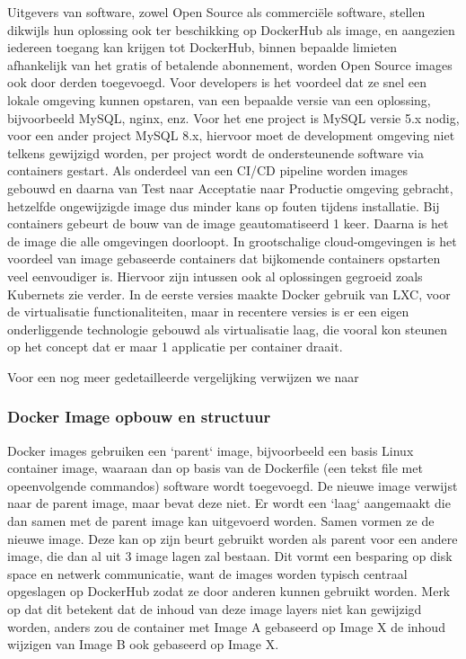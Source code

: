 Uitgevers van software, zowel Open Source als commerciële software, stellen dikwijls hun oplossing ook ter beschikking op DockerHub als image, en aangezien iedereen toegang kan krijgen tot DockerHub, binnen bepaalde limieten afhankelijk van het gratis of betalende abonnement, worden Open Source images ook door derden toegevoegd.
\newline
Voor developers is het voordeel dat ze snel een lokale omgeving kunnen opstaren, van een bepaalde versie van een oplossing, bijvoorbeeld MySQL, nginx, enz. Voor het ene project is MySQL versie 5.x nodig, voor een ander project MySQL 8.x, hiervoor moet de development omgeving niet telkens gewijzigd worden, per project wordt de ondersteunende software via containers gestart.
\newline
Als onderdeel van een CI/CD pipeline worden images gebouwd en daarna van Test naar Acceptatie naar Productie omgeving gebracht, hetzelfde ongewijzigde image dus minder kans op fouten tijdens installatie. Bij containers gebeurt de bouw van de image geautomatiseerd 1 keer. Daarna is het de image die alle omgevingen doorloopt.
\newline
In grootschalige cloud-omgevingen is het voordeel van image gebaseerde containers dat bijkomende containers opstarten veel eenvoudiger is. Hiervoor zijn intussen ook al oplossingen gegroeid zoals Kubernets zie verder.
\newline
In de eerste versies maakte Docker gebruik van LXC, voor de virtualisatie functionaliteiten, maar in recentere versies is er een eigen onderliggende technologie gebouwd als virtualisatie laag, die vooral kon steunen op het concept dat er maar 1 applicatie per container draait. 
\newline
\newline

Voor een nog meer gedetailleerde vergelijking verwijzen we naar \textcite{Tunggal2023}

\subsubsection{Docker Image opbouw en structuur}
Docker images gebruiken een `parent` image, bijvoorbeeld een basis Linux container image, waaraan dan op basis van de Dockerfile (een tekst file met opeenvolgende commandos) software wordt toegevoegd. De nieuwe image verwijst naar de parent image, maar bevat deze niet. Er wordt een `laag` aangemaakt die dan samen met de parent image kan uitgevoerd worden. Samen vormen ze de nieuwe image.
Deze kan op zijn beurt gebruikt worden als parent voor een andere image, die dan al uit 3 image lagen zal bestaan. Dit vormt een besparing op disk space en netwerk communicatie, want de images worden typisch centraal opgeslagen op DockerHub zodat ze door anderen kunnen gebruikt worden.
Merk op dat dit betekent dat de inhoud van deze image layers niet kan gewijzigd worden, anders zou de container met Image A gebaseerd op Image X de inhoud wijzigen van Image B ook gebaseerd op Image X. 

